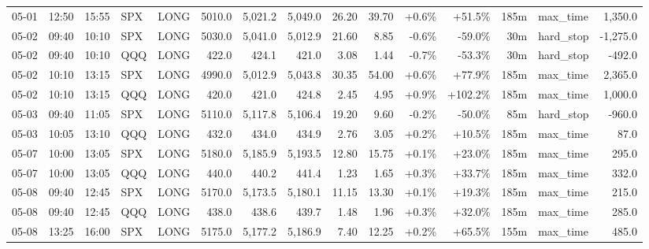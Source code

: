 \documentclass[11pt,a4paper,twoside]{article}
\begin{document}
\begin{landscape}
\begin{center}
\begin{longtable}{>{\color{txtmain}}l l l l l r r r r r r r r >{\color{txtmain}}l r}
05-01 & 12:50 & 15:55 & SPX & LONG & 5010.0 & 5,021.2 & 5,049.0 & 26.20 & 39.70 & \textcolor{wingreen}{+0.6\%} & \textcolor{wingreen}{+51.5\%} & 185m & max\_time & \textcolor{wingreen}{1,350.0} \\
05-02 & 09:40 & 10:10 & SPX & LONG & 5030.0 & 5,041.0 & 5,012.9 & 21.60 & 8.85 & \textcolor{lossred}{-0.6\%} & \textcolor{lossred}{-59.0\%} & 30m & hard\_stop & \textcolor{lossred}{-1,275.0} \\
05-02 & 09:40 & 10:10 & QQQ & LONG & 422.0 & 424.1 & 421.0 & 3.08 & 1.44 & \textcolor{lossred}{-0.7\%} & \textcolor{lossred}{-53.3\%} & 30m & hard\_stop & \textcolor{lossred}{-492.0} \\
05-02 & 10:10 & 13:15 & SPX & LONG & 4990.0 & 5,012.9 & 5,043.8 & 30.35 & 54.00 & \textcolor{wingreen}{+0.6\%} & \textcolor{wingreen}{+77.9\%} & 185m & max\_time & \textcolor{wingreen}{2,365.0} \\
05-02 & 10:10 & 13:15 & QQQ & LONG & 420.0 & 421.0 & 424.8 & 2.45 & 4.95 & \textcolor{wingreen}{+0.9\%} & \textcolor{wingreen}{+102.2\%} & 185m & max\_time & \textcolor{wingreen}{1,000.0} \\
05-03 & 09:40 & 11:05 & SPX & LONG & 5110.0 & 5,117.8 & 5,106.4 & 19.20 & 9.60 & \textcolor{lossred}{-0.2\%} & \textcolor{lossred}{-50.0\%} & 85m & hard\_stop & \textcolor{lossred}{-960.0} \\
05-03 & 10:05 & 13:10 & QQQ & LONG & 432.0 & 434.0 & 434.9 & 2.76 & 3.05 & \textcolor{wingreen}{+0.2\%} & \textcolor{wingreen}{+10.5\%} & 185m & max\_time & \textcolor{wingreen}{87.0} \\
05-07 & 10:00 & 13:05 & SPX & LONG & 5180.0 & 5,185.9 & 5,193.5 & 12.80 & 15.75 & \textcolor{wingreen}{+0.1\%} & \textcolor{wingreen}{+23.0\%} & 185m & max\_time & \textcolor{wingreen}{295.0} \\
05-07 & 10:00 & 13:05 & QQQ & LONG & 440.0 & 440.2 & 441.4 & 1.23 & 1.65 & \textcolor{wingreen}{+0.3\%} & \textcolor{wingreen}{+33.7\%} & 185m & max\_time & \textcolor{wingreen}{332.0} \\
05-08 & 09:40 & 12:45 & SPX & LONG & 5170.0 & 5,173.5 & 5,180.1 & 11.15 & 13.30 & \textcolor{wingreen}{+0.1\%} & \textcolor{wingreen}{+19.3\%} & 185m & max\_time & \textcolor{wingreen}{215.0} \\
05-08 & 09:40 & 12:45 & QQQ & LONG & 438.0 & 438.6 & 439.7 & 1.48 & 1.96 & \textcolor{wingreen}{+0.3\%} & \textcolor{wingreen}{+32.0\%} & 185m & max\_time & \textcolor{wingreen}{285.0} \\
05-08 & 13:25 & 16:00 & SPX & LONG & 5175.0 & 5,177.2 & 5,186.9 & 7.40 & 12.25 & \textcolor{wingreen}{+0.2\%} & \textcolor{wingreen}{+65.5\%} & 155m & max\_time & \textcolor{wingreen}{485.0} \\

\end{longtable}
\end{center}
\end{landscape}
\end{document}

